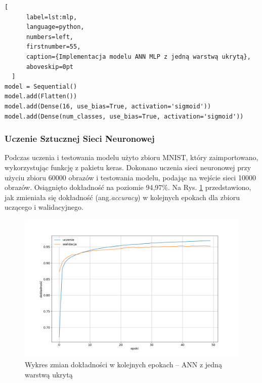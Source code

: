 \begin{addmargin}[10mm]{0mm}
  \begin{lstlisting}[
      label=lst:mlp,
      language=python,
      numbers=left,
      firstnumber=55,
      caption={Implementacja modelu ANN MLP z jedną warstwą ukrytą},
      aboveskip=0pt
  ]
model = Sequential()
model.add(Flatten())
model.add(Dense(16, use_bias=True, activation='sigmoid'))
model.add(Dense(num_classes, use_bias=True, activation='sigmoid'))

  \end{lstlisting}
  \end{addmargin}

\subsubsection{Uczenie Sztucznej Sieci Neuronowej}
Podczas uczenia i testowania modelu użyto zbioru MNIST, który zaimportowano, wykorzystując
funkcję z pakietu keras. Dokonano uczenia sieci neuronowej przy użyciu zbioru 60000 
obrazów i testowania modelu, podając na wejście sieci 10000 obrazów. Osiągnięto 
dokładność na poziomie 94,97\%. Na Rys. \ref{keras-accuracy1} przedstawiono, jak zmieniała się dokładność (ang.\emph{accuracy}) w kolejnych epokach dla zbioru uczącego i walidacyjnego.

\begin{figure}
  \centering
  \includegraphics[width=\textwidth]{img/keras-accuracy1.png}
  \caption{Wykres zmian dokładności w kolejnych epokach -- ANN z jedną warstwą ukrytą}
  \label{keras-accuracy1}
\end{figure}


